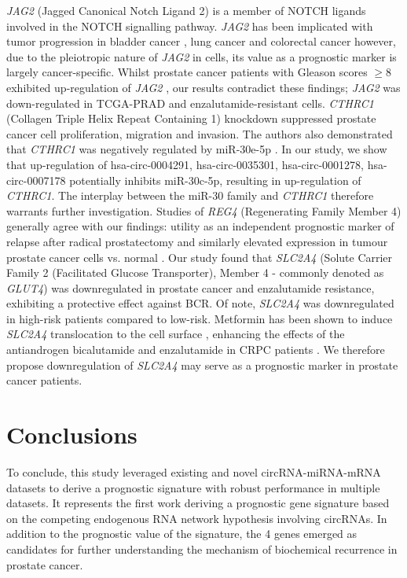 \documentclass[twocolumn]{bmcart}%
\begin{document}
\textit{JAG2} (Jagged Canonical Notch Ligand 2) is a member of NOTCH ligands involved in the NOTCH signalling pathway. \textit{JAG2} has been implicated with tumor progression in bladder cancer \cite{Chen2020Jul}, lung cancer \cite{Yang2011Apr} and colorectal cancer \cite{Vaish2017Aug} however, due to the pleiotropic nature of \textit{JAG2} in cells, its value as a prognostic marker is largely cancer-specific. Whilst prostate cancer patients with Gleason scores $\geq$8 exhibited up-regulation of \textit{JAG2} \cite{Ross2011Oct}, our results contradict these findings; \textit{JAG2} was down-regulated in TCGA-PRAD and enzalutamide-resistant cells. \textit{CTHRC1} (Collagen Triple Helix Repeat Containing 1) knockdown suppressed prostate cancer cell proliferation, migration and invasion. The authors also demonstrated that \textit{CTHRC1} was negatively regulated by miR-30e-5p \cite{Ma2020Apr}. In our study, we show that up-regulation of hsa-circ-0004291, hsa-circ-0035301, hsa-circ-0001278, hsa-circ-0007178 potentially inhibits miR-30c-5p, resulting in up-regulation of \textit{CTHRC1}. The interplay between the miR-30 family and \textit{CTHRC1} therefore warrants further investigation. Studies of \textit{REG4} (Regenerating Family Member 4) generally agree with our findings: utility as an independent prognostic marker of relapse after radical prostatectomy \cite{Ohara2008Aug} and similarly elevated expression in tumour prostate cancer cells vs. normal \cite{Gu2005Mar}. Our study found that \textit{SLC2A4} (Solute Carrier Family 2 (Facilitated Glucose Transporter), Member 4 - commonly denoted as \textit{GLUT4}) was downregulated in prostate cancer and enzalutamide resistance, exhibiting a protective effect against BCR. Of note, \textit{SLC2A4} was downregulated in high-risk patients compared to low-risk. Metformin has been shown to induce \textit{SLC2A4} translocation to the cell surface \cite{Lee2012Dec}, enhancing the effects of the antiandrogen bicalutamide and enzalutamide in CRPC patients \cite{Spratt2013Apr,Colquhoun2012Dec,Liu2017Aug}. We therefore propose downregulation of \textit{SLC2A4} may serve as a prognostic marker in prostate cancer patients. 

\section*{Conclusions}
To conclude, this study leveraged existing and novel circRNA-miRNA-mRNA datasets to derive a prognostic signature with robust performance in multiple datasets. It represents the first work deriving a prognostic gene signature based on the competing endogenous RNA network hypothesis involving circRNAs. In addition to the prognostic value of the signature, the 4 genes emerged as candidates for further understanding the mechanism of biochemical recurrence in prostate cancer. 
\end{document}
